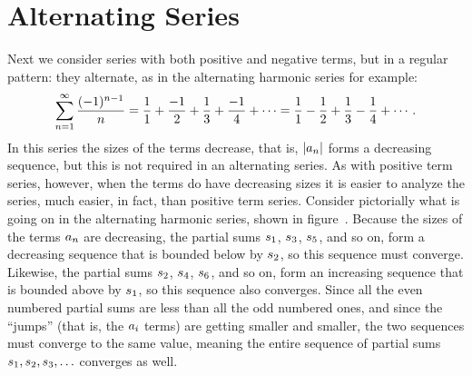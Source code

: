 \chapter{Alternating Series}{}{}

\nobreak
Next we consider series with both positive and negative terms, but in
a regular pattern: they alternate, as in the {\dfont alternating
  harmonic series%
%
\/} for example:
$$
  \sum_{n=1}^\infty {(-1)^{n-1}\over n}=
  {1\over1}+{-1\over2}+{1\over3}+{-1\over4}+\cdots=
  {1\over1}-{1\over2}+{1\over3}-{1\over4}+\cdots.
$$
In this series the sizes of the terms decrease, that is, 
$\displaystyle |a_n|$ forms a decreasing sequence, but this is not required in an
alternating series. As with positive term series, however, when the
terms do have decreasing sizes it is easier to analyze the series,
much easier, in fact, than positive term series. Consider pictorially
what is going on in the alternating harmonic series, shown in
figure~. Because the sizes of
the terms $\displaystyle a_n$ are decreasing, the partial sums $\displaystyle s_1$, $\displaystyle s_3$, $\displaystyle s_5$,
and so on, form a decreasing sequence that is bounded below by
$\displaystyle s_2$, so this sequence must converge.
Likewise, the partial sums $\displaystyle s_2$, $\displaystyle s_4$, $\displaystyle s_6$,
and so on, form an increasing sequence that is bounded above by
$\displaystyle s_1$, so this sequence also converges. Since all the even numbered
partial sums are less than all the odd numbered ones, and since the
``jumps'' (that is, the $\displaystyle a_i$ terms) are getting smaller and smaller,
the two sequences must converge to the same value, meaning the entire
sequence of partial sums $\displaystyle s_1,s_2,s_3,\ldots$ converges as well.


